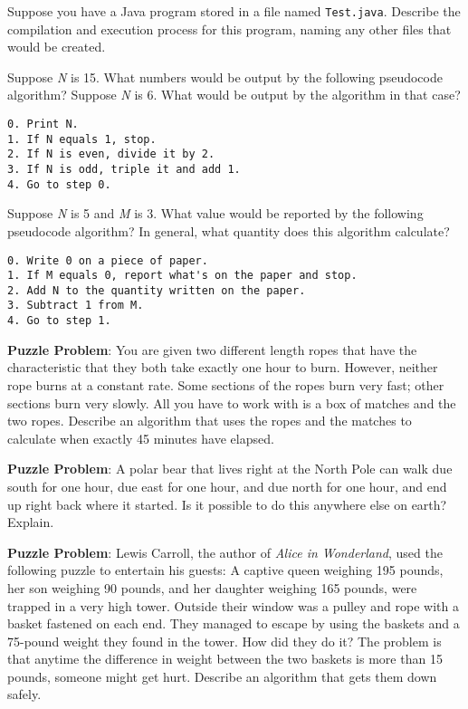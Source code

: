 \begin{EXRtwo}
\item  Suppose you have a Java program stored in a file named
{\tt Test.java}. Describe  the compilation and execution process
for this program, naming any other files that would be created.

\item  Suppose {\it N} is 15. What numbers would be output by the following
pseudocode algorithm? Suppose {\it N} is 6. What would be output by
the algorithm in that case?


\begin{jjjlisting}
\begin{lstlisting}
0. Print N.
1. If N equals 1, stop.
2. If N is even, divide it by 2.
3. If N is odd, triple it and add 1.
4. Go to step 0.
\end{lstlisting}
\end{jjjlisting}


\item  Suppose {\it N} is 5 and {\it M} is 3. What value would be reported
by the following pseudocode algorithm? In general, what quantity does
this algorithm calculate?

\begin{jjjlisting}
\begin{lstlisting}
0. Write 0 on a piece of paper.
1. If M equals 0, report what's on the paper and stop.
2. Add N to the quantity written on the paper.
3. Subtract 1 from M.
4. Go to step 1.
\end{lstlisting}
\end{jjjlisting}

\item  {\bf Puzzle Problem}: You are given two different length 
ropes that have
the characteristic that they both take exactly one hour to
burn.  However, neither rope burns at a constant rate.   Some sections
of the ropes burn very fast; other sections burn very slowly.  All you
have to work with is a box of matches and the two ropes.  Describe an
algorithm that uses the ropes and the matches to calculate when
exactly 45 minutes have elapsed.

\item  {\bf Puzzle Problem}: A polar bear that lives right at the North Pole
can walk due south for one hour, due east for one hour, and due north
for one hour, and end up right back where it started.   Is it possible
to do this anywhere else on earth? Explain.


\item  {\bf Puzzle Problem}: Lewis Carroll, the author of {\it Alice 
in Wonderland},
used the following puzzle to entertain his guests: A captive queen
weighing 195 pounds, her son weighing 90 pounds, and her daughter
weighing 165 pounds, were trapped in a very high tower.   Outside their
window was a pulley and rope with a basket fastened on each end.  They
managed to escape by using the baskets and a 75-pound weight they
found in the tower.  How did they do it? The problem is that anytime the
difference in weight between the two baskets is more than 15 pounds,
someone might get hurt.  Describe an algorithm that gets them down
safely.


\end{EXRtwo}
